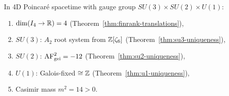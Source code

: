 \begin{theorem}
\label{thm:yang-mills-main}
In 4D Poincar\'{e} spacetime with gauge group
$SU(3) \times SU(2) \times U(1)$:
\begin{enumerate}
  \item $\dim(I_4 \to \mathbb{R}) = 4$
    (Theorem~\ref{thm:finrank-translations}),
  \item $SU(3)$: $A_2$ root system from $\mathbb{Z}[\zeta_6]$
    (Theorem~\ref{thm:su3-uniqueness}),
  \item $SU(2)$: $\mathrm{AF}_{\mathrm{gei}}^2 = -12$
    (Theorem~\ref{thm:su2-uniqueness}),
  \item $U(1)$: Galois-fixed $\cong \mathbb{Z}$
    (Theorem~\ref{thm:u1-uniqueness}),
  \item Casimir mass $m^2 = 14 > 0$.
\end{enumerate}
\end{theorem}
